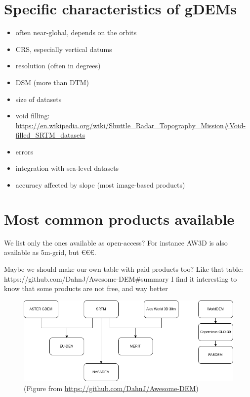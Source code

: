 %
\section[Specific characteristics]{Specific characteristics of gDEMs}

\begin{itemize}
  \item often near-global, depends on the orbits
  \item CRS, especially vertical datums
  \item resolution (often in degrees)
  \item DSM (more than DTM)
  \item size of datasets
  \item void filling: \url{https://en.wikipedia.org/wiki/Shuttle_Radar_Topography_Mission#Void-filled_SRTM_datasets}
  \item errors
  \item integration with sea-level datasets
  \item accuracy affected by slope (most image-based products)
\end{itemize}


%
\section[Most common products]{Most common products available}

We list only the ones available as open-access?
For instance AW3D is also available as 5m-grid, but €€€.

Maybe we should make our own table with paid products too? Like that table: https://github.com/DahnJ/Awesome-DEM#summary
I find it interesting to know that some products are not free, and way better

\begin{figure}
  \centering
  \includegraphics[width=\linewidth]{gdem_inheritance}
  \caption{(Figure from \url{https://github.com/DahnJ/Awesome-DEM})}%
\end{figure}


